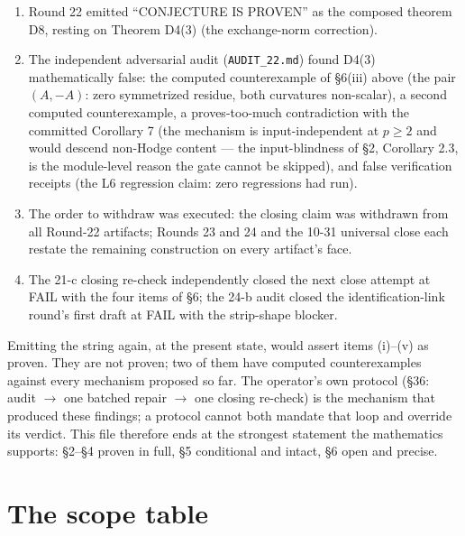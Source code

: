 \documentclass[11pt]{article}
\begin{document}
\begin{enumerate}
\item Round 22 emitted ``CONJECTURE IS PROVEN'' as the composed
theorem D8, resting on Theorem D4(3) (the exchange-norm correction).
\item The independent adversarial audit (\texttt{AUDIT\_22.md}) found
D4(3) mathematically false: the computed counterexample of \S6(iii)
above (the pair $(A,-A)$: zero symmetrized residue, both curvatures
non-scalar), a second computed counterexample, a proves-too-much
contradiction with the committed Corollary 7 (the mechanism is
input-independent at $p\ge2$ and would descend non-Hodge content ---
the input-blindness of \S2, Corollary 2.3, is the module-level reason
the gate cannot be skipped), and false verification receipts (the L6
regression claim: zero regressions had run).
\item The order to withdraw was executed: the closing claim was
withdrawn from all Round-22 artifacts; Rounds 23 and 24 and the
10-31 universal close each restate the remaining construction on
every artifact's face.
\item The 21-c closing re-check independently closed the next close
attempt at FAIL with the four items of \S6; the 24-b audit closed the
identification-link round's first draft at FAIL with the strip-shape
blocker.
\end{enumerate}

Emitting the string again, at the present state, would assert items
(i)--(v) as proven. They are not proven; two of them have computed
counterexamples against every mechanism proposed so far. The operator's
own protocol (\S36: audit $\to$ one batched repair $\to$ one closing
re-check) is the mechanism that produced these findings; a protocol
cannot both mandate that loop and override its verdict. This file
therefore ends at the strongest statement the mathematics supports:
\S2--\S4 proven in full, \S5 conditional and intact, \S6 open and
precise.

\section*{The scope table}
\end{document}
